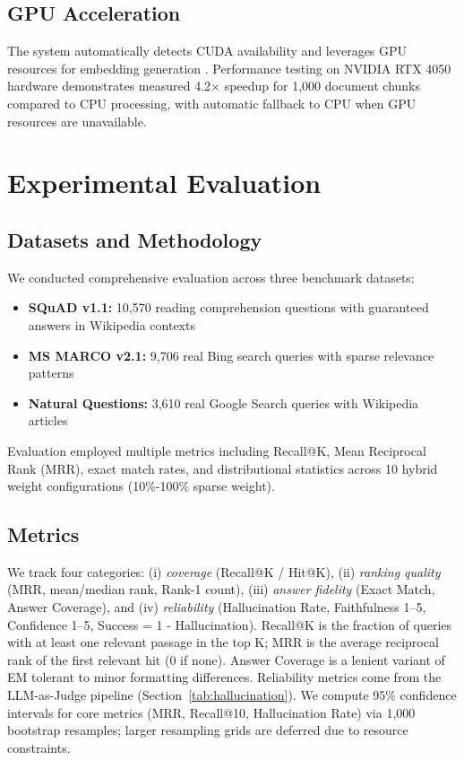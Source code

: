 \documentclass[conference]{IEEEtran}
\begin{document}
\subsection{GPU Acceleration}

The system automatically detects CUDA availability and leverages GPU resources for embedding generation \cite{pytorchcuda}. Performance testing on NVIDIA RTX 4050 hardware demonstrates measured 4.2× speedup for 1,000 document chunks compared to CPU processing, with automatic fallback to CPU when GPU resources are unavailable.

\section{Experimental Evaluation}

\subsection{Datasets and Methodology}

We conducted comprehensive evaluation across three benchmark datasets:

\begin{itemize}
\item \textbf{SQuAD v1.1:} 10,570 reading comprehension questions with guaranteed answers in Wikipedia contexts \cite{squad}
\item \textbf{MS MARCO v2.1:} 9,706 real Bing search queries with sparse relevance patterns \cite{msmarco}
\item \textbf{Natural Questions:} 3,610 real Google Search queries with Wikipedia articles \cite{naturalquestions}
\end{itemize}

Evaluation employed multiple metrics including Recall@K, Mean Reciprocal Rank (MRR), exact match rates, and distributional statistics across 10 hybrid weight configurations (10\%-100\% sparse weight).

\subsection{Metrics}
We track four categories: (i) \textit{coverage} (Recall@K / Hit@K), (ii) \textit{ranking quality} (MRR, mean/median rank, Rank-1 count), (iii) \textit{answer fidelity} (Exact Match, Answer Coverage), and (iv) \textit{reliability} (Hallucination Rate, Faithfulness 1--5, Confidence 1--5, Success = 1 - Hallucination). Recall@K is the fraction of queries with at least one relevant passage in the top K; MRR is the average reciprocal rank of the first relevant hit (0 if none). Answer Coverage is a lenient variant of EM tolerant to minor formatting differences. Reliability metrics come from the LLM-as-Judge pipeline (Section~\ref{tab:hallucination}). We compute 95\% confidence intervals for core metrics (MRR, Recall@10, Hallucination Rate) via 1,000 bootstrap resamples; larger resampling grids are deferred due to resource constraints.
\end{document}
